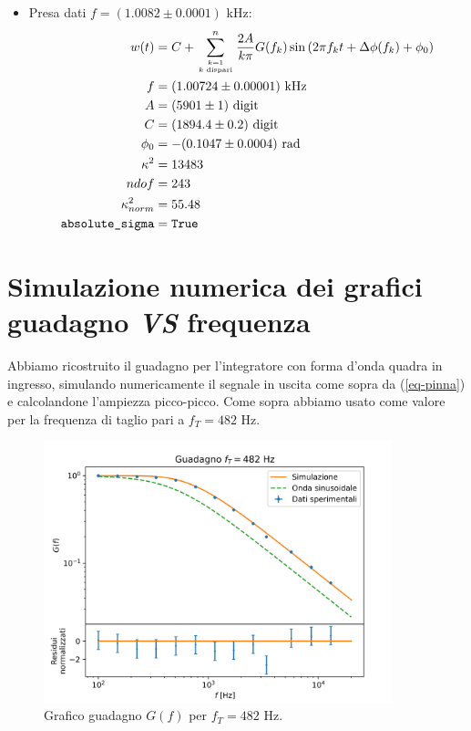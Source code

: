 \documentclass{article}[a4paper, oneside,11pt]
\begin{document}
\begin{itemize}
        \item Presa dati $f=(1.0082\pm0.0001)$ kHz:
        \begin{align*}
            w(t) &= C + \sum_{{k=1}\atop{k \text{ dispari}}}^n \frac{2A}{k\pi} G(f_k) \sin\left(2\pi f_k t + \Delta\phi(f_k) + \phi_0\right)\\
            f &=  (1.00724 \pm 0.00001) \text{ kHz}\\
            A &=  (5901 \pm 1) \text{ digit} \\
            C &=  (1894.4 \pm 0.2) \text{ digit} \\
            \phi_0 &=  -(0.1047 \pm 0.0004) \text{ rad} \\
            \kappa^2 &=  13483 \\
            ndof &=  243 \\
            \kappa^2_{norm} &= 55.48\\
            \texttt{absolute\_sigma} &= \texttt{True}
        \end{align*}
    \end{itemize}
    
\section{Simulazione numerica dei grafici guadagno \textit{VS} frequenza}

    Abbiamo ricostruito il guadagno per l'integratore con forma d'onda quadra in ingresso, simulando numericamente il segnale in uscita come sopra da (\ref{eq-pinna}) e calcolandone l'ampiezza picco-picco. Come sopra abbiamo usato come valore per la frequenza di taglio pari a $f_T=482$ Hz.\\
   
    \begin{figure}[H]
        \centering
        \includegraphics[width=0.9\textwidth]{img/Guadagno.png}
        \caption{Grafico guadagno $G(f)$ per $f_T=482$ Hz.}
    \end{figure}
    
\end{document}
